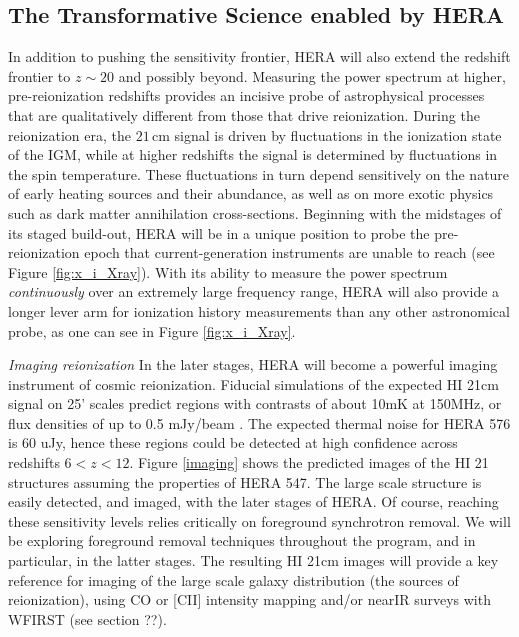 \documentclass[preprint]{aastex}
\begin{document}
\subsection{The Transformative Science enabled by HERA}


In addition to pushing the sensitivity frontier, HERA will also extend the redshift frontier 
to $z \sim 20$ and possibly beyond.  Measuring the power spectrum at higher, pre-reionization redshifts provides
an incisive probe of astrophysical processes that are qualitatively different from those that
drive reionization.  During the reionization era, the $21\,\textrm{cm}$ signal is driven by
fluctuations in the ionization state of the IGM, while at higher redshifts the signal is determined
by fluctuations in the spin temperature.  These fluctuations in turn depend sensitively on the nature of early heating sources  and their abundance, as well as on more exotic physics such as dark matter annihilation cross-sections.  Beginning with the midstages of its staged build-out, HERA will be in a unique position to probe the pre-reionization epoch that current-generation instruments are unable to reach (see Figure \ref{fig:x_i_Xray}).  With its ability to measure the power spectrum \emph{continuously} over an extremely large frequency range,
HERA will also provide a longer lever arm for ionization history measurements than any other astronomical probe,
as one can see in Figure \ref{fig:x_i_Xray}.

{\sl Imaging reionization} In the later stages, HERA will become a powerful imaging instrument of cosmic reionization. Fiducial simulations of the expected HI 21cm signal on 25' scales predict regions with contrasts of about 10mK at 150MHz, or flux densities of up to 0.5 mJy/beam \citep{mcquinn_et_al2007}. The expected thermal noise for HERA 576 is 60 uJy, hence these regions could be detected at high confidence across redshifts $6<z<12$. Figure \ref{imaging} shows the predicted images of the HI 21 structures  assuming the properties of HERA 547. The large scale structure is easily detected, and imaged, with the later stages of HERA. Of course, reaching these sensitivity levels relies critically on foreground synchrotron removal. We will be exploring foreground removal techniques throughout the program, and in particular, in the latter stages. The resulting HI 21cm images will provide a key reference for imaging of the large scale galaxy distribution (the sources of reionization), using CO or [CII] intensity mapping and/or nearIR surveys with WFIRST (see section ??).
\end{document}
